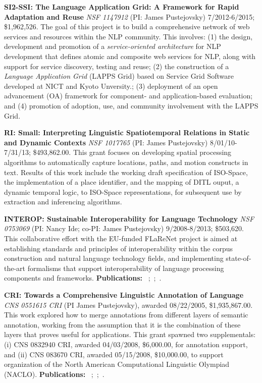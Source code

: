 \documentclass[10pt]{article}
\newcommand{\miniskip}{\vspace*{1mm}}
\begin{document}
\miniskip\noindent
 {\bf SI2-SSI: The Language Application Grid: A Framework for Rapid Adaptation and Reuse} 
{\it NSF 1147912} (PI: James Pustejovsky) 7/2012-6/2015; \$1,962,526.
The goal of this  project is to  build  a comprehensive network of web services and resources within the NLP community. This involves:
(1) the design, development  and promotion of a {\it service-oriented architecture} for NLP development that defines atomic and composite web services for NLP, along with support for service discovery, testing and reuse; (2)  the construction of a {\it Language Application Grid} (LAPPS Grid) based on Service Grid Software developed at NICT and Kyoto Unversity.; (3)  deployment of an open advancement (OA) framework for
component- and application-based evaluation; and  (4)  promotion of adoption, use, and community involvement with the LAPPS Grid.  

\miniskip\noindent
 {\bf 
RI: Small: Interpreting Linguistic Spatiotemporal Relations in Static and Dynamic Contexts}
{\it NSF 1017765} (PI: James Pustejovsky)  8/01/10-7/31/13; 
\$493,862.00. This grant focuses on developing spatial processing algorithms  to automatically capture locations, paths, and motion constructs in text.  Results of this work include the working draft specification of ISO-Space, the implementation of a place identifier, and the mapping of DITL ouput, a dynamic temporal logic, to ISO-Space representations, for subsequent use by extraction and inferencing algorithms. 

\miniskip\noindent
{\bf INTEROP: Sustainable Interoperability for Language Technology} 
{\it NSF 0753069} (PI: Nancy Ide; co-PI: James Pustejovsky) 9/2008-8/2013; \$503,620.
This collaborative effort with the EU-funded FLaReNet project is aimed at establishing standards and principles of interoperability within the corpus construction and natural language technology fields, and implementing state-of-the-art formalisms that support interoperability of language processing components and frameworks.  {\bf Publications: }~\cite{idesuderman09};~\cite{ide-bunt:2010:LAW-IV};~\cite{cieri-etal}.

\miniskip\noindent
{\bf CRI: Towards a Comprehensive Linguistic Annotation of Language} {\it CNS 0551615 CRI} (PI James Pustejovsky), awarded 08/22/2005, \$1,935,867.00. This work explored how to merge annotations from different layers of semantic annotation, working from the assumption that it is the combination of these layers that proves useful for applications. This grant spawned two supplementals: (i) CNS 0832940 CRI, awarded 04/03/2008, \$6,000.00, for annotation support, and (ii) CNS 083670 CRI, awarded 05/15/2008, \$10,000.00, to support organization of the North American Computational Linguistic Olympiad (NACLO). {\bf Publications: }~\cite{verhagen-stubbs-pustejovsky:2007:LAW};~\cite{verhagen-EtAl:2007:SemEval-2007};~\cite{verhagen-pustejovsky:2007:Interoperability}.
\end{document}
